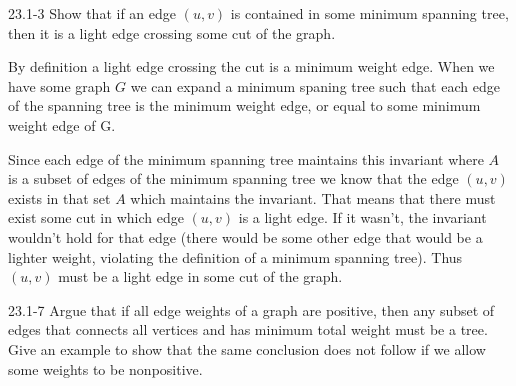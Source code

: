 




\homeworkheader{\classnameandsection}

\begin{problem}{23.1-3}
  Show that if an edge $(u,v)$ is contained in some minimum spanning tree, then it is a light edge crossing some cut of
  the graph.
  \begin{solution}
    By definition a light edge crossing the cut is a minimum weight edge. When we have some graph $G$ we can expand a
    minimum spaning tree such that each edge of the spanning tree is the minimum weight edge, or equal to some minimum
    weight edge of G.

    Since each edge of the minimum spanning tree maintains this invariant where $A$ is a subset of edges of the minimum
    spanning tree we know that the edge $(u,v)$ exists in that set $A$ which maintains the invariant. That means that
    there must exist some cut in which edge $(u,v)$ is a light edge. If it wasn't, the invariant wouldn't hold for that
    edge (there would be some other edge that would be a lighter weight, violating the definition of a minimum spanning
    tree).  Thus $(u,v)$ must be a light edge in some cut of the graph.
  \end{solution}
\end{problem}

\begin{problem}{23.1-7}
  Argue that if all edge weights of a graph are positive, then any subset of edges that connects all vertices and has
  minimum total weight must be a tree. Give an example to show that the same conclusion does not follow if we allow some
  weights to be nonpositive.
\end{problem}

